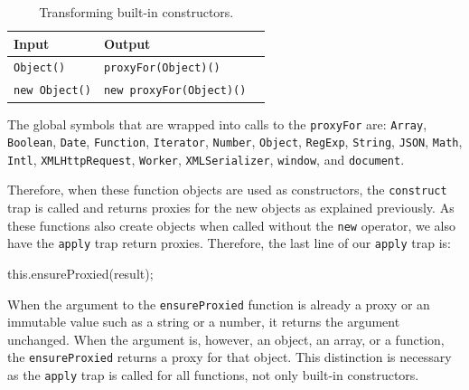 \begin{table}[h]
\begin{center}
\begin{tabular}{| l | l | l |}
\hline
Input & Output \\ \hline
\lstinline|Object()| & \lstinline|proxyFor(Object)()| \\ \hline
\lstinline|new Object()| & \lstinline|new proxyFor(Object)()| \\ \hline
\end{tabular}
\end{center}
\caption[Table caption text]{Transforming built-in constructors.}
\label{table:transformingBuiltInConstructors}
\end{table}

The global symbols that are wrapped into calls to the \lstinline{proxyFor} are: \lstinline{Array}, \lstinline{Boolean}, \lstinline{Date}, \lstinline{Function}, \lstinline{Iterator}, \lstinline{Number}, \lstinline{Object}, \lstinline{RegExp}, \lstinline{String}, \lstinline{JSON}, \lstinline{Math}, \lstinline{Intl}, \lstinline{XMLHttpRequest}, \lstinline{Worker}, \lstinline{XMLSerializer}, \lstinline{window}, and \lstinline{document}.

Therefore, when these function objects are used as constructors, the \lstinline{construct} trap is called and returns proxies for the new objects as explained previously.
As these functions also create objects when called without the \lstinline{new} operator, we also have the \lstinline{apply} trap return proxies.
Therefore, the last line of our \lstinline{apply} trap is:

\begin{code}{}{}
this.ensureProxied(result);
\end{code}
\iffalse
\end{verbatim}\fi

When the argument to the \lstinline{ensureProxied} function is already a proxy or an immutable value such as a string or a number, it returns the argument unchanged.
When the argument is, however, an object, an array, or a function, the \lstinline{ensureProxied} returns a proxy for that object.
This distinction is necessary as the \lstinline{apply} trap is called for all functions, not only built-in constructors.


